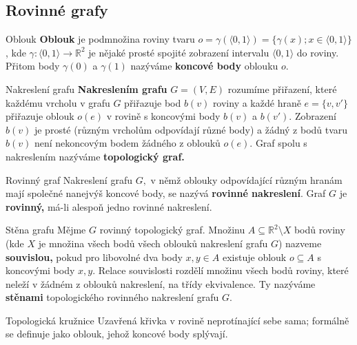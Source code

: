 \subsection{Rovinné grafy}

\begin{definiceN}{Oblouk}
\textbf{Oblouk} je podmnožina roviny tvaru $o=\gamma(\langle0,1\rangle)=\{\gamma(x); x \in \langle0,1\rangle\}$, kde $\gamma:\langle0,1\rangle \to \mathbb{R}^2$ je nějaké prosté spojité zobrazení intervalu $\langle0,1\rangle$ do roviny. Přitom body $\gamma(0)$ a $\gamma(1)$ nazýváme \textbf{koncové body} oblouku $o$.
\end{definiceN}

\begin{definiceN}{Nakreslení grafu}
\textbf{Nakreslením grafu} $G=(V,E)$ rozumíme přiřazení, které každému vrcholu v grafu $G$ přiřazuje bod $b(v)$ roviny a každé hraně $e=\{v,v'\}$ přiřazuje oblouk $o(e)$ v rovině s koncovými body $b(v)$ a $b(v').$ Zobrazení $b(v)$ je prosté (různým vrcholům odpovídají různé body) a žádný z bodů tvaru $b(v)$ není nekoncovým bodem žádného z oblouků $o(e).$ Graf spolu s nakreslením nazýváme \textbf{topologický graf.}
\end{definiceN}

\begin{definiceN}{Rovinný graf}
Nakreslení grafu $G,$ v němž oblouky odpovídající různým hranám mají společné nanejvýš koncové body, se nazývá \textbf{rovinné nakreslení}. Graf $G$ je \textbf{rovinný,} má-li alespoň jedno rovinné nakreslení.
\end{definiceN}

\begin{definiceN}{Stěna grafu}
Mějme $G$ rovinný topologický graf. Množinu $A \subseteq \mathbb{R}^2\setminus X$ bodů roviny (kde $X$ je množina všech bodů všech oblouků nakreslení grafu $G$) nazveme \textbf{souvislou,} pokud pro libovolné dva body $x,y \in A$ existuje oblouk $o \subseteq A$ s koncovými body $x,y.$  Relace souvislosti rozdělí množinu všech bodů roviny, které neleží v žádném z oblouků nakreslení, na třídy ekvivalence. Ty nazýváme \textbf{stěnami} topologického rovinného nakreslení grafu $G$.
\end{definiceN}

\begin{definiceN}{Topologická kružnice}
Uzavřená křivka v rovině neprotínající sebe sama; formálně se definuje jako oblouk, jehož koncové body splývají.
\end{definiceN}

